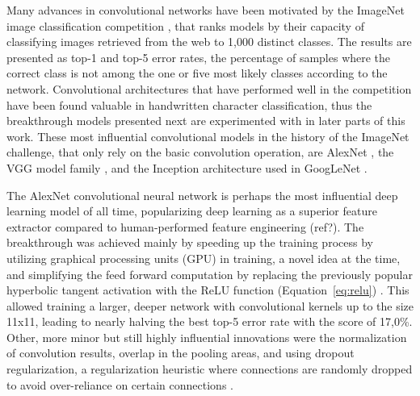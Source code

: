 \documentclass{article}
\begin{document}
Many advances in convolutional networks have been motivated by the ImageNet image classification competition \cite{imagenet},
 that ranks models by their capacity of classifying images retrieved from the web to 1,000 distinct classes.
 The results are presented as top-1 and top-5 error rates, the percentage of samples 
where the correct class is not among the one or five most likely classes according to the network. Convolutional architectures
that have performed well in the competition have been found valuable in handwritten character classification, thus the 
breakthrough models presented next are experimented with in later parts of this work.
These most influential convolutional models in the history of the ImageNet challenge,  that
only rely on the basic convolution operation, are AlexNet \cite{alexnet}, 
the VGG model family \cite{vgg}, and
the Inception architecture used in GoogLeNet \cite{googlelenet}.

The AlexNet convolutional neural network is perhaps the most influential deep learning model of all time, 
popularizing deep learning as a superior feature extractor compared to human-performed feature engineering (ref?).
The breakthrough was achieved mainly by speeding up the training process by utilizing graphical processing units (GPU)
in training, a novel idea at the time, and simplifying the feed forward computation by replacing the previously popular 
hyperbolic tangent activation with the ReLU function (Equation~\ref{eq:relu}) \cite{alexnet}.
 This allowed training a larger, deeper network
with convolutional kernels up to the size 11x11, leading to nearly halving the best top-5 error rate with the score of
17,0\%. Other, more minor but still highly influential innovations were the normalization of convolution results, 
overlap in the pooling areas, and using dropout regularization, a regularization heuristic where connections are 
randomly dropped to avoid over-reliance on certain connections \cite{dropout}.
\end{document}
